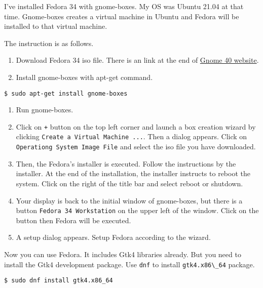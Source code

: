 I've installed Fedora 34 with gnome-boxes. My OS was Ubuntu 21.04 at
that time. Gnome-boxes creates a virtual machine in Ubuntu and Fedora
will be installed to that virtual machine.

The instruction is as follows.

\begin{enumerate}
\def\labelenumi{\arabic{enumi}.}
\tightlist
\item
  Download Fedora 34 iso file. There is an link at the end of
  \href{https://forty.gnome.org/}{Gnome 40 website}.
\item
  Install gnome-boxes with apt-get command.
\end{enumerate}

\begin{lstlisting}
$ sudo apt-get install gnome-boxes
\end{lstlisting}

\begin{enumerate}
\def\labelenumi{\arabic{enumi}.}
\setcounter{enumi}{2}
\tightlist
\item
  Run gnome-boxes.
\item
  Click on \passthrough{\lstinline!+!} button on the top left corner and
  launch a box creation wizard by clicking
  \passthrough{\lstinline!Create a Virtual Machine ...!}. Then a dialog
  appears. Click on
  \passthrough{\lstinline!Operationg System Image File!} and select the
  iso file you have downloaded.
\item
  Then, the Fedora's installer is executed. Follow the instructions by
  the installer. At the end of the installation, the installer instructs
  to reboot the system. Click on the right of the title bar and select
  reboot or shutdown.
\item
  Your display is back to the initial window of gnome-boxes, but there
  is a button \passthrough{\lstinline!Fedora 34 Workstation!} on the
  upper left of the window. Click on the button then Fedora will be
  executed.
\item
  A setup dialog appears. Setup Fedora according to the wizard.
\end{enumerate}

Now you can use Fedora. It includes Gtk4 libraries already. But you need
to install the Gtk4 development package. Use
\passthrough{\lstinline!dnf!} to install
\passthrough{\lstinline!gtk4.x86\_64!} package.

\begin{lstlisting}
$ sudo dnf install gtk4.x86_64
\end{lstlisting}

